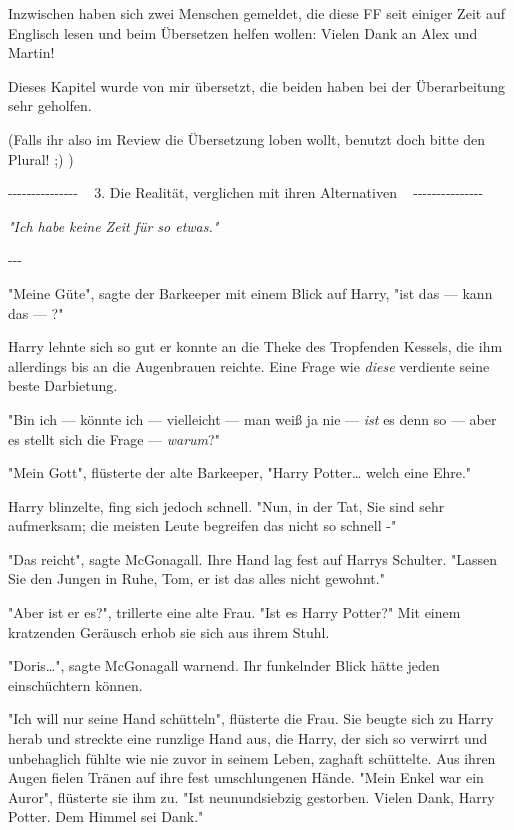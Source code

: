 

\hypertarget{die-realituxe4t-verglichen-mit-ihren-alternativen}{%

Inzwischen haben sich zwei Menschen gemeldet, die diese FF seit einiger Zeit auf Englisch lesen und beim Übersetzen helfen wollen: Vielen Dank an Alex und Martin!

Dieses Kapitel wurde von mir übersetzt, die beiden haben bei der Überarbeitung sehr geholfen.

(Falls ihr also im Review die Übersetzung loben wollt, benutzt doch bitte den Plural! ;) )

-\/-\/-\/-\/-\/-\/-\/-\/-\/-\/-\/-\/-\/-\/- ~ 3. Die Realität, verglichen mit ihren Alternativen ~ -\/-\/-\/-\/-\/-\/-\/-\/-\/-\/-\/-\/-\/-\/-

\emph{"Ich habe keine Zeit für so etwas."}

-\/-\/-

"Meine Güte", sagte der Barkeeper mit einem Blick auf Harry, "ist das --- kann das --- ?"

Harry lehnte sich so gut er konnte an die Theke des Tropfenden Kessels, die ihm allerdings bis an die Augenbrauen reichte. Eine Frage wie \emph{diese} verdiente seine beste Darbietung.

"Bin ich --- könnte ich --- vielleicht --- man weiß ja nie --- \emph{ist} es denn so --- aber es stellt sich die Frage --- \emph{warum}?"

"Mein Gott", flüsterte der alte Barkeeper, "Harry Potter… welch eine Ehre."

Harry blinzelte, fing sich jedoch schnell. "Nun, in der Tat, Sie sind sehr aufmerksam; die meisten Leute begreifen das nicht so schnell -"

"Das reicht", sagte McGonagall. Ihre Hand lag fest auf Harrys Schulter. "Lassen Sie den Jungen in Ruhe, Tom, er ist das alles nicht gewohnt."

"Aber ist er es?", trillerte eine alte Frau. "Ist es Harry Potter?" Mit einem kratzenden Geräusch erhob sie sich aus ihrem Stuhl.

"Doris…", sagte McGonagall warnend. Ihr funkelnder Blick hätte jeden einschüchtern können.

"Ich will nur seine Hand schütteln", flüsterte die Frau. Sie beugte sich zu Harry herab und streckte eine runzlige Hand aus, die Harry, der sich so verwirrt und unbehaglich fühlte wie nie zuvor in seinem Leben, zaghaft schüttelte. Aus ihren Augen fielen Tränen auf ihre fest umschlungenen Hände. "Mein Enkel war ein Auror", flüsterte sie ihm zu. "Ist neunundsiebzig gestorben. Vielen Dank, Harry Potter. Dem Himmel sei Dank."

}
